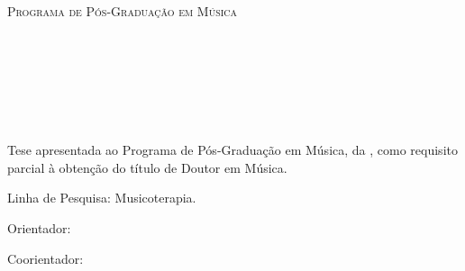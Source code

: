 

\begin{center}
    \textsc{\instituicao}\\
    \textsc{\centro}\\
    \textsc{Programa de Pós-Graduação em Música}

    \vspace{4.5cm}
\autor\

    \begin{center}

    \vspace*{\fill} %
   \textbf{\titulo}
    \vspace*{\fill} %
    \end{center}

    \vfill
    \cidade\ \\
    \ano\
\end{center}
\thispagestyle{empty} %
\newpage

\vspace{1cm}	

\begin{center}	
\textsc{\titulo}
\end{center}

\vspace{4.5cm}	

\begin{center}
\autor\
\end{center}
\begin{center}
    \vspace*{\fill} %
    \hspace*{\fill} %
    \parbox{10cm} %
    {\noindent
    Tese apresentada ao Programa de Pós-Graduação em Música, da \instituicao, como requisito parcial à obtenção do título de Doutor em Música.

    \par Linha de Pesquisa: Musicoterapia.

    \vspace{0.5cm}
    \par Orientador: \orientador{}
    \par Coorientador: \coorientador{}
    }
    \vfill
    \vspace*{\fill} %
\end{center}


\begin{center}
\cidade\ \\
\ano\
\end{center}

\thispagestyle{empty} %
\newpage\
